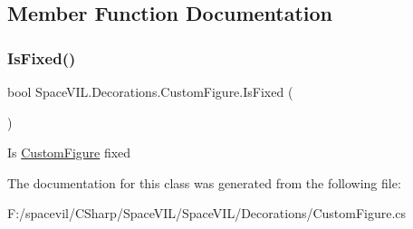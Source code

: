 \subsection{Member Function Documentation}
\mbox{\label{class_space_v_i_l_1_1_decorations_1_1_custom_figure_a4b2ff5319a7d0b34076da118107ee937}} 
\subsubsection{\texorpdfstring{Is\+Fixed()}{IsFixed()}}
{\footnotesize\ttfamily bool Space\+V\+I\+L.\+Decorations.\+Custom\+Figure.\+Is\+Fixed (\begin{DoxyParamCaption}{ }\end{DoxyParamCaption})\hspace{0.3cm}{\ttfamily [inline]}}



Is \mbox{\hyperlink{class_space_v_i_l_1_1_decorations_1_1_custom_figure}{Custom\+Figure}} fixed 



The documentation for this class was generated from the following file\+:\begin{DoxyCompactItemize}
\item 
F\+:/spacevil/\+C\+Sharp/\+Space\+V\+I\+L/\+Space\+V\+I\+L/\+Decorations/Custom\+Figure.\+cs\end{DoxyCompactItemize}
